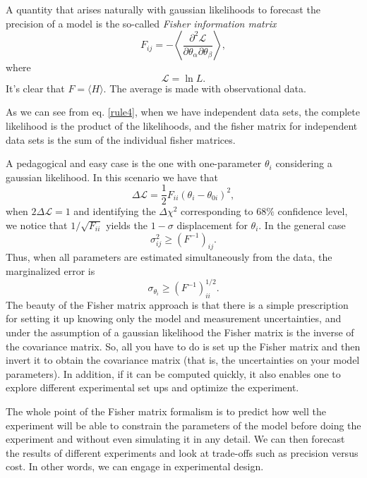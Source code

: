 \documentclass[onecolumn,           %
               showpacs,            %
               preprintnumbers,     %
               aps,                 %
               letterpaper,             %
               superscriptaddress,      %
               nofootinbib,         %
               tightenlines,        %
               floats,floatfix      %
               ,usenatbib,
               ]{revtex4-1}
\begin{document}
A quantity that arises naturally with gaussian likelihoods to forecast the precision of a model is the so-called \textit{Fisher information matrix}
\begin{equation}
F_{ij}=-\left\langle \frac{\partial^2 \mathcal{L}}{\partial \theta_\alpha \partial \theta_\beta}\right\rangle,
\end{equation}
where 
\begin{equation}
\mathcal{L}=\ln L.
\end{equation}
It's clear that $F=\langle H\rangle$. The average is made with observational data. 

As we can see from eq. \eqref{rule4}, when we have independent data sets, the complete likelihood is the product of the likelihoods, and the fisher matrix for independent data sets is the sum of the individual fisher matrices. 

A pedagogical and easy case is the one with one-parameter $\theta_i$ considering a gaussian likelihood. In this scenario we have that
\begin{equation}
\Delta \mathcal{L}=\frac{1}{2}F_{ii}(\theta_i- \theta_{0i})^2,
\end{equation}
when $2\Delta\mathcal{L}=1$ and identifying the $\Delta \chi^2$ corresponding to $68\%$ confidence level, we notice that $1/\sqrt{F_{ii}}$ yields the $1-\sigma$ displacement for $\theta_i$. In the general case
\begin{equation}\label{rao}
\sigma_{ij}^2 \geq (F^{-1})_{ij}.
\end{equation}
Thus, when all parameters are estimated simultaneously from the data, the marginalized error is
\begin{equation}
\sigma_{\theta_i}\geq (F^{-1})^{1/2}_{ii}.
\end{equation}
The beauty of the Fisher matrix approach is that there is a simple prescription for setting it up knowing only the model and measurement uncertainties, and under the assumption of a gaussian likelihood the Fisher matrix is the inverse of the covariance matrix. So, all you have to do is set up the Fisher matrix and then invert it to obtain the covariance matrix (that is, the uncertainties on your model parameters). In addition, if it can be computed quickly, it also enables one to explore different experimental set ups and optimize the experiment.

The whole point of the Fisher matrix formalism is to predict how well the experiment will be able to constrain the parameters of the model before doing the experiment and without even simulating it in any detail. We can then forecast the results of different experiments and look at trade-offs such as precision versus cost. In other words, we can engage in experimental design.
\end{document}

